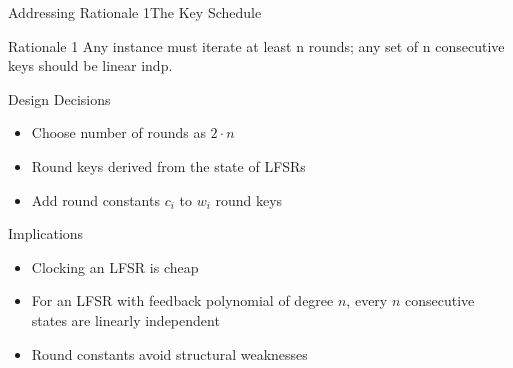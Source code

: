 \begin{frame}{Addressing Rationale 1}{The Key Schedule}
    \vspace{-60pt}
    \begin{minipage}{0.985\textwidth}
    \begin{exampleblock}{Rationale 1}
        Any instance must iterate at least n rounds; any set of n consecutive keys should be linear indp.
    \end{exampleblock}
    \end{minipage}

    \begin{minipage}[t][85pt][t]{0.47\textwidth}
        \begin{block}{Design Decisions}
            \begin{itemize}
                \item Choose number of rounds as $2 \cdot n$\\[5pt]
                \item Round keys derived from the state of LFSRs\\[5pt]
                \item Add round constants $c_i$ to $w_i$ round keys
            \end{itemize}
        \end{block}
    \end{minipage}
    \hfill
    \begin{minipage}[t][85pt][t]{0.47\textwidth}
        \begin{block}{Implications}
            \begin{itemize}
                \item Clocking an LFSR is cheap
                \item For an LFSR with feedback polynomial of degree $n$, every $n$ consecutive states are linearly independent
                \item Round constants avoid structural weaknesses
            \end{itemize}
        \end{block}
    \end{minipage}
\end{frame}

